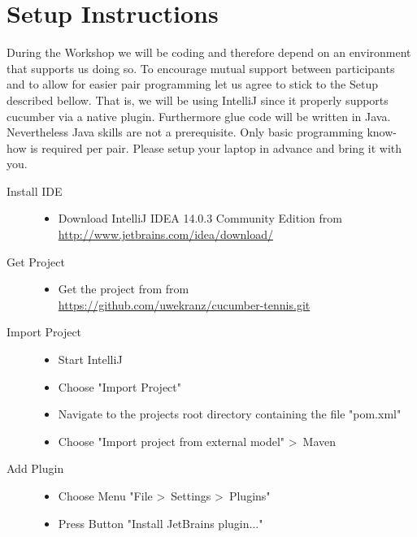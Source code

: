 \documentclass{article}
\begin{document}
\thispagestyle{empty}

\section*{Setup Instructions}
During the Workshop we will be coding and therefore depend on an environment that supports us doing so. To encourage mutual support between participants and to allow for easier pair programming let us agree to stick to the Setup described bellow. That is, we will be using IntelliJ since it properly supports cucumber via a native plugin. Furthermore glue code will be written in Java. Nevertheless Java skills are not a prerequisite. Only basic programming know-how is required per pair. Please setup your laptop in advance and bring it with you.
  
	\begin{description}
		\item[Install IDE] \hfill
		\begin{itemize}
			\item Download IntelliJ IDEA 14.0.3 Community Edition from\\
                	\url{http://www.jetbrains.com/idea/download/}
		\end{itemize}
		\item[Get Project] \hfill
		\begin{itemize} 
                	\item Get the project from from\\
                \url{https://github.com/uwekranz/cucumber-tennis.git}
                \end{itemize}
                \item[Import Project] \hfill
                \begin{itemize}
                        \item Start IntelliJ 
		        \item Choose "Import Project"
			\item Navigate to the projects root directory containing the file "pom.xml"
       	        	\item Choose "Import project from external model" \textgreater\ Maven
		\end{itemize}
		\item[Add Plugin] \hfill
		\begin{itemize}
	                \item Choose Menu "File \textgreater\ Settings \textgreater\ Plugins"
		        \item Press Button "Install JetBrains plugin..."

\end{itemize}
\end{description}
\end{document}
